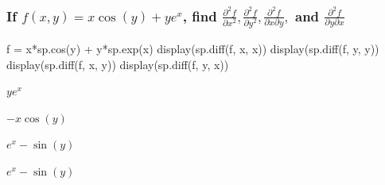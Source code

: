 \documentclass[
  letterpaper,
  DIV=11,
  numbers=noendperiod]{scrartcl}
\newenvironment{Shaded}{\begin{snugshade}}{\end{snugshade}}
\newcommand{\NormalTok}[1]{\textcolor[rgb]{0.00,0.23,0.31}{#1}}
\newcommand{\OperatorTok}[1]{\textcolor[rgb]{0.37,0.37,0.37}{#1}}
\begin{document}
\hypertarget{if-fxy-xcosyyex-find-fracpartial2-fpartial-x2-fracpartial2-fpartial-y2-fracpartial2-fpartial-x-partial-y-and-fracpartial2-fpartial-y-partial-x}{%
\subsubsection{\texorpdfstring{If \(f(x,y) = x\cos(y)+ye^x\), find
\(\frac{\partial^2 f}{\partial x^2}, \frac{\partial^2 f}{\partial y^2}, \frac{\partial^2 f}{\partial x \partial y},\)
and
\(\frac{\partial^2 f}{\partial y \partial x}\)}{If f(x,y) = x\textbackslash cos(y)+ye\^{}x, find \textbackslash frac\{\textbackslash partial\^{}2 f\}\{\textbackslash partial x\^{}2\}, \textbackslash frac\{\textbackslash partial\^{}2 f\}\{\textbackslash partial y\^{}2\}, \textbackslash frac\{\textbackslash partial\^{}2 f\}\{\textbackslash partial x \textbackslash partial y\}, and \textbackslash frac\{\textbackslash partial\^{}2 f\}\{\textbackslash partial y \textbackslash partial x\}}}\label{if-fxy-xcosyyex-find-fracpartial2-fpartial-x2-fracpartial2-fpartial-y2-fracpartial2-fpartial-x-partial-y-and-fracpartial2-fpartial-y-partial-x}}

\begin{Shaded}
\begin{Highlighting}[numbers=left,,]
\NormalTok{f }\OperatorTok{=}\NormalTok{ x}\OperatorTok{*}\NormalTok{sp.cos(y) }\OperatorTok{+}\NormalTok{ y}\OperatorTok{*}\NormalTok{sp.exp(x)}
\NormalTok{display(sp.diff(f, x, x))}
\NormalTok{display(sp.diff(f, y, y))}
\NormalTok{display(sp.diff(f, x, y))}
\NormalTok{display(sp.diff(f, y, x))}
\end{Highlighting}
\end{Shaded}

$\displaystyle y e^{x}$

$\displaystyle - x \cos{\left(y \right)}$

$\displaystyle e^{x} - \sin{\left(y \right)}$

$\displaystyle e^{x} - \sin{\left(y \right)}$
\end{document}

